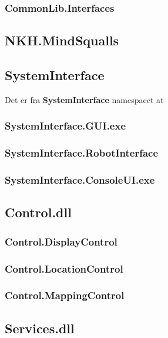 \subsubsection{CommonLib.Interfaces}

\subsection{NKH.MindSqualls}\label{arkitektur:mindsqualls}


\subsection{SystemInterface}\label{arkitektur:systeminterface}
Det er fra \textbf{SystemInterface} namespacet at 

\subsubsection{SystemInterface.GUI.exe}

\subsubsection{SystemInterface.RobotInterface}

\subsubsection{SystemInterface.ConsoleUI.exe}

\subsection{Control.dll}\label{arkitektur:control}


\subsubsection{Control.DisplayControl}

\subsubsection{Control.LocationControl}

\subsubsection{Control.MappingControl}


\subsection{Services.dll}\label{arkitektur:services}


